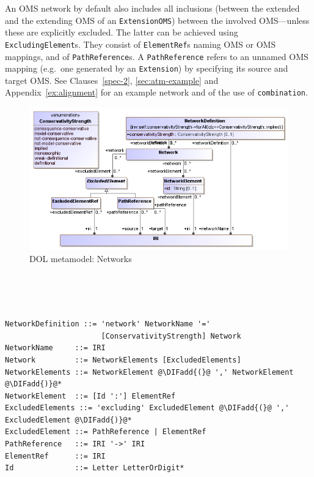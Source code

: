 \documentclass[10pt, a4paper]{isov2}
\newcommand{\bc}[1]{~\\{\color{violet}\large \hrulefill \href{http://issues.omg.org/browse/DOL-#1}{\normalfont{JIRA DOL-{}#1}} \hrulefill\\}  }
\newcommand{\ec}[0]{~\\{{\color{violet}\large \hrulefill {\normalfont{end}} \hrulefill\\}  }}
\newcommand*{\syntax}[1]{\texttt{#1}}
\providecommand{\DIFaddtex}[1]{{\protect\color{blue}\uwave{#1}}} %
\providecommand{\DIFadd}[1]{\texorpdfstring{\DIFaddtex{#1}}{#1}} %
\begin{document}
An OMS network by default also includes all inclusions (between
the extended and the extending OMS of an \syntax{ExtensionOMS})
between the involved OMS---unless these are explicitly excluded.
The latter can be achieved using \syntax{ExcludingElement}s.
They consist of \syntax{ElementRef}s naming OMS or OMS mappings,
and of \syntax{PathReference}s. A \syntax{PathReference} refers
to an unnamed OMS mapping (e.g.\ one generated by an \syntax{Extension}) 
by specifying its source and target OMS. See Clauses~\ref{spec-2}, \ref{sec:atm-example}
and Appendix~\ref{ex:alignment} for an example network and of the use of \syntax{combination}.

\medskip
\begin{figure}
  \centering
    \includegraphics[scale=0.47]{mof/networks.png}
  \caption{DOL metamodel: Networks}
  \label{fig:networks}
\end{figure}




\vspace{-1.4em}
\bc{92}
\begin{lstlisting}[language=ebnf,escapeinside={@@},morecomment={[l]{\%\%\ }}]

NetworkDefinition ::= 'network' NetworkName '='
                      [ConservativityStrength] Network
NetworkName     ::= IRI
Network         ::= NetworkElements [ExcludedElements]
NetworkElements ::= NetworkElement @\DIFadd{(}@ ',' NetworkElement @\DIFadd{)}@*
NetworkElement  ::= [Id ':'] ElementRef
ExcludedElements ::= 'excluding' ExcludedElement @\DIFadd{(}@ ',' ExcludedElement @\DIFadd{)}@*
ExcludedElement ::= PathReference | ElementRef
PathReference   ::= IRI '->' IRI
ElementRef      ::= IRI
Id              ::= Letter LetterOrDigit*
\end{lstlisting}
\ec
\end{document}
